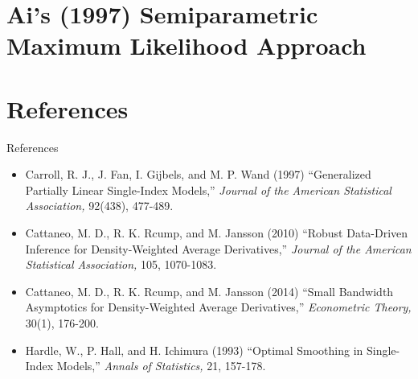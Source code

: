 \documentclass[xcolor=svgnames,dvipdfmx,cjk]{beamer}
\theoremstyle{example}
\begin{document}
\section{Ai's (1997) Semiparametric Maximum Likelihood Approach}
  
  
  
  
  
  


  
  
  
\section{References}
  


\begin{frame}{References}
\begin{itemize}
  \item Carroll, R. J., J. Fan, I. Gijbels, and M. P. Wand (1997)
        ``Generalized Partially Linear Single-Index Models,'' 
        \textit{Journal of the American Statistical Association,} 92(438), 477-489.
  \item Cattaneo, M. D., R. K. Rcump, and M. Jansson (2010)
        ``Robust Data-Driven Inference for Density-Weighted Average Derivatives,''
        \textit{Journal of the American Statistical Association,} 105, 1070-1083.
  \item Cattaneo, M. D., R. K. Rcump, and M. Jansson (2014)
        ``Small Bandwidth Asymptotics for Density-Weighted Average Derivatives,''
        \textit{Econometric Theory,} 30(1), 176-200.
  \item Hardle, W., P. Hall, and H. Ichimura (1993)
        ``Optimal Smoothing in Single-Index Models,'' 
        \textit{Annals of Statistics,} 21, 157-178.
\end{itemize}
\end{frame}
\end{document}
